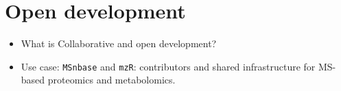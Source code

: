 \section{Open development}


\begin{frame}{}
 
  \begin{itemize}
  \item What is Collaborative and open development?
  \item Use case: \texttt{MSnbase} and \texttt{mzR}: contributors and
    shared infrastructure for MS-based proteomics and metabolomics.
  \end{itemize}
  
\end{frame}
